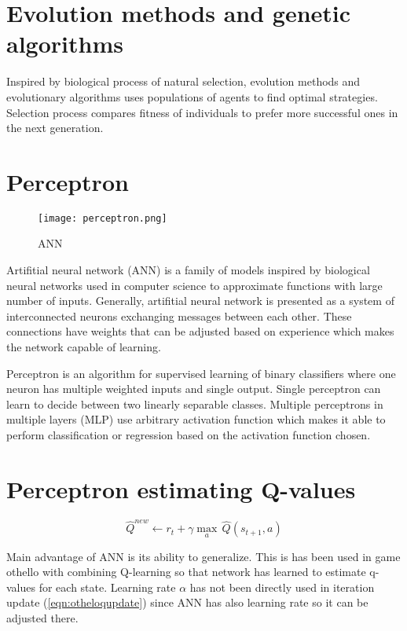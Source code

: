 \section{Evolution methods and genetic algorithms}
Inspired by biological process of natural selection, evolution methods and
evolutionary algorithms uses populations of agents to find optimal strategies.
Selection process compares fitness of individuals to prefer more successful
ones in the next generation.



\section{Perceptron}
\begin{wrapfigure}{r}{0.4\textwidth}
  \vspace*{-1.85cm}
  \centering
  \texttt{[image: perceptron.png]}
  \vspace*{-0.85cm}
  \caption{ANN}
  \label{fig:network}
  \vspace*{-0.60cm}
\end{wrapfigure}

Artifitial neural network (ANN) is a family of models inspired by biological
neural networks used in computer science to approximate functions with
large number of inputs. Generally, artifitial neural network is presented
as a system of interconnected neurons exchanging messages between each
other. These connections have weights that can be adjusted based on
experience which makes the network capable of learning.

Perceptron is an algorithm for supervised learning of binary classifiers
where one neuron has multiple weighted inputs and single output. Single
perceptron can learn to decide between two linearly separable
classes. Multiple perceptrons in multiple layers (MLP) use arbitrary
activation function which makes it able to perform classification or
regression based on the activation function chosen.

\section{Perceptron estimating Q-values}
\begin{wrapfigure}{r}{0.42\textwidth}
  \vspace*{-1.15cm}
  \begin{equation}
    \label{eqn:otheloqupdate}
    \hat{Q}^{new}\!\leftarrow\!r_t\!+\!{\gamma}{\max_a}\,\hat{Q}(s_{t+1},\!a)
  \end{equation}
  \vspace*{-0.95cm}
\end{wrapfigure}

Main advantage of ANN is its ability to generalize. This is has been used
in game othello \cite{othello} with combining Q-learning so that network
has learned to estimate q-values for each state. Learning rate $\alpha$ has
not been directly used in iteration update (\ref{eqn:otheloqupdate}) since
ANN has also learning rate so it can be adjusted there.

